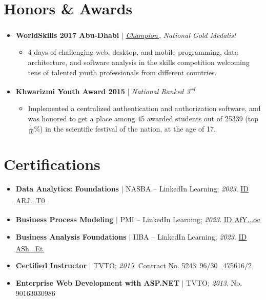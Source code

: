 \documentclass[9pt,a4paper]{article}
\let\orighref\href
\renewcommand{\href}[2]{\orighref{#1}{#2\,{\textsuperscript{\tiny{\textcolor{heritagered}{\faExternalLink}}}}}}
\newlength{\ListLeftMargin}   \setlength{\ListLeftMargin}{0.15in}
\newlength{\ProjectTopSep}   \setlength{\ProjectTopSep}{1pt}
\newlength{\ProjectItemSep}  \setlength{\ProjectItemSep}{1pt}
\newcommand{\deemph}[1]{{\color{gray}#1}}
\begin{document}
\section{Honors \& Awards}
\begin{itemize}[leftmargin=\ListLeftMargin, label={}]
  \item \textbf{WorldSkills 2017 Abu-Dhabi} $|$ \href{https://www.credly.com/badges/4333ef3c-2cf8-43f3-a102-33ffb50ba6f2/public_url}{\emph{Champion}}, \emph{National Gold Medalist}
    \begin{itemize}[leftmargin=*, topsep=\ProjectTopSep, itemsep=\ProjectItemSep, parsep=0pt, label=\textbullet]
      \item 4 days of challenging web, desktop, and mobile programming, data architecture, and software analysis in the  skills competition welcoming tens of talented youth professionals from different countries.
    \end{itemize}

  \item \textbf{Khwarizmi Youth Award 2015} $|$ \emph{National Ranked 3\textsuperscript{rd}}
    \begin{itemize}[leftmargin=*, topsep=\ProjectTopSep, itemsep=\ProjectItemSep, parsep=0pt, label=\textbullet]
      \item Implemented a centralized authentication and authorization software, and was honored to get a place among 45 awarded students out of 25339 (top \(\frac{1}{10}\)\%) in the  scientific festival of the nation, at the age of 17.
    \end{itemize}
\end{itemize}

\section{Certifications}
\begin{itemize}[leftmargin=\ListLeftMargin, label={}]
  \item \textbf{Data Analytics: Foundations} $|$ NASBA -- LinkedIn Learning; \emph{2023}. \href{https://www.linkedin.com/learning/certificates/10c24841aac6b0c139f4971a8efd6d10356dc105124e31fa10eb32aa14ce3392}{\deemph{ID} \small{ARJ...T0}}
  \item \textbf{Business Process Modeling} $|$ PMI -- LinkedIn Learning; \emph{2023}. \href{https://www.linkedin.com/learning/certificates/3d1e244d9234631a908175486d19855434634d7f61cec316326ba4eb269bb041}{\deemph{ID} \small{AfY...oc}}
  \item \textbf{Business Analysis Foundations} $|$ IIBA -- LinkedIn Learning; \emph{2023}. \href{https://www.linkedin.com/learning/certificates/51dd265ef63b58255245c8f7438549551c92d30031e81b9ad864ee6994e1f6e6}{\deemph{ID} \small{ASh...Et}}
  \item \textbf{Certified Instructor} $|$ TVTO; \emph{2015}. \deemph{Contract No.} 5243\, 96/30\_475616/2
  \item \textbf{Enterprise Web Development with ASP.NET} $|$ TVTO; \emph{2013}. \deemph{No.} 90163030986
\end{itemize}
\end{document}
